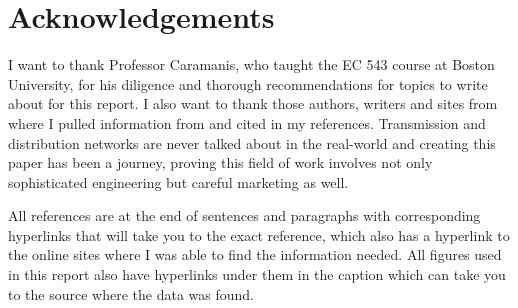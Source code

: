 \documentclass[12pt]{article}
\begin{document}
\section{Acknowledgements}
\indent
\indent I want to thank Professor Caramanis, who taught the EC 543 course at Boston University, for his diligence and thorough recommendations for topics to write about for this report. I also want to thank those authors, writers and sites from where I pulled information from and cited in my references. Transmission and distribution networks are never talked about in the real-world and creating this paper has been a journey, proving this field of work involves not only sophisticated engineering but careful marketing as well. \par 
\indent All references are at the end of sentences and paragraphs with corresponding hyperlinks that will take you to the exact reference, which also has a hyperlink to the online sites where I was able to find the information needed. All figures used in this report also have hyperlinks under them in the caption which can take you to the source where the data was found. 
\cleardoublepage
{}
{}
\printbibliography{}
\end{document}
